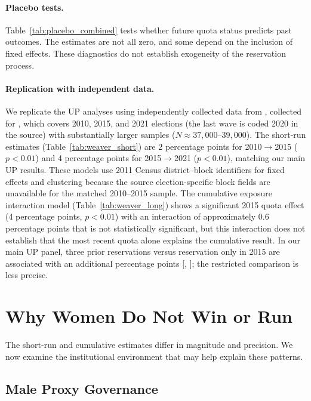 \documentclass[12pt]{article}
\begin{document}
\paragraph{Placebo tests.} Table~\ref{tab:placebo_combined} tests whether future quota status predicts past outcomes. The estimates are not all zero, and some depend on the inclusion of fixed effects. These diagnostics do not establish exogeneity of the reservation process.

\paragraph{Replication with independent data.} We replicate the UP analyses using independently collected data from \citet{weaver_data}, collected for \citet{narasimhan2024polity}, which covers 2010, 2015, and 2021 elections (the last wave is coded 2020 in the source) with substantially larger samples ($N \approx 37{,}000$--$39{,}000$). The short-run estimates (Table~\ref{tab:weaver_short}) are 2 percentage points for 2010$\rightarrow$2015 ($p < 0.01$) and 4 percentage points for 2015$\rightarrow$2021 ($p < 0.01$), matching our main UP results. These models use 2011 Census district--block identifiers for fixed effects and clustering because the source election-specific block fields are unavailable for the matched 2010--2015 sample. The cumulative exposure interaction model (Table~\ref{tab:weaver_long}) shows a significant 2015 quota effect (4 percentage points, $p < 0.01$) with an interaction of approximately 0.6 percentage points that is not statistically significant, but this interaction does not establish that the most recent quota alone explains the cumulative result. In our main UP panel, three prior reservations versus reservation only in 2015 are associated with an additional \upFullExtra{} percentage points [\upFullExtraLow{}, \upFullExtraHigh{}]; the restricted comparison is less precise.

\section{Why Women Do Not Win or Run}\label{sec:mechanisms}

The short-run and cumulative estimates differ in magnitude and precision. We now examine the institutional environment that may help explain these patterns.

\subsection{Male Proxy Governance}\label{sec:phone_audit}
\end{document}
